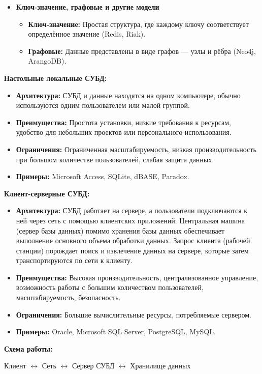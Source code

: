 \documentclass[a4paper, 12pt]{report}
\numberwithin{equation}{section}
\begin{document}
\begin{itemize}
	\item \textbf{Ключ-значение, графовые и другие модели}
	\begin{itemize}
		\item \textbf{Ключ-значение:} Простая структура, где каждому ключу соответствует определённое значение (Redis, Riak).
		\item \textbf{Графовые:} Данные представлены в виде графов --- узлы и рёбра (Neo4j, ArangoDB).
	\end{itemize}
\end{itemize}
\textbf{Настольные локальные СУБД:}
\begin{itemize}
	\item \textbf{Архитектура:} СУБД и данные находятся на одном компьютере, обычно используются одним пользователем или малой группой.
	\item \textbf{Преимущества:} Простота установки, низкие требования к ресурсам, удобство для небольших проектов или персонального использования.
	\item \textbf{Ограничения:} Ограниченная масштабируемость, низкая производительность при большом количестве пользователей, слабая защита данных.
	\item \textbf{Примеры:} Microsoft Access, SQLite, dBASE, Paradox.
\end{itemize}
\textbf{Клиент-серверные СУБД:}
\begin{itemize}
	\item \textbf{Архитектура:} СУБД работает на сервере, а пользователи подключаются к ней через сеть с помощью клиентских приложений. Центральная машина (сервер базы данных) помимо хранения базы данных обеспечивает выполнение основного объема обработки данных. Запрос клиента (рабочей станции) порождает поиск и извлечение данных на сервере, которые затем транспортируются по сети к клиенту.
	\item \textbf{Преимущества:} Высокая производительность, централизованное управление, возможность работы с большим количеством пользователей, масштабируемость, безопасность.
	\item \textbf{Ограничения:} Большие вычислительные ресурсы, потребляемые
	сервером.
	\item \textbf{Примеры:} Oracle, Microsoft SQL Server, PostgreSQL, MySQL.
\end{itemize}
\textbf{Схема работы:}
\begin{center}
	Клиент $\longleftrightarrow$ Сеть $\longleftrightarrow$ Сервер СУБД $\longleftrightarrow$ Хранилище данных
\end{center}
\end{document}

